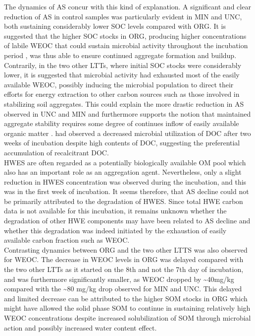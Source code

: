 \documentclass[12pt]{report}
\newcommand{\myGreen}[1]{\textcolor{olive}{#1}} %
\begin{document}
The dynamics of AS concur with this kind of explanation. A significant and clear reduction of AS in control samples was particularly evident in MIN and UNC, both sustaining considerably lower SOC levels compared with ORG. It is suggested that the higher SOC stocks in ORG, producing higher concentrations of labile WEOC that could sustain microbial activity throughout the incubation period , was thus able to ensure continued aggregate formation and buildup. Contrarily, in the two other LTTs, where initial SOC stocks were considerably lower, it is suggested that microbial activity had exhausted most of the easily available WEOC, possibly inducing the microbial population to direct their efforts for energy extraction to other carbon sources such as those involved in stabilizing soil aggregates. This could explain the more drastic reduction in AS observed in UNC and MIN and furthermore supports the notion that maintained aggregate stability requires some degree of continues inflow of easily available organic matter \citep{golchin1994}. \citet{cook1992} had observed a decreased microbial utilization of DOC after two weeks of incubation despite high contents of DOC, suggesting the preferential accumulation of recalcitrant DOC.\\
HWES are often regarded as a potentially biologically available OM pool which also has an important role as an aggregation agent. Nevertheless, only a slight reduction in HWES concentration was observed during the incubation, and this was in the first week of incubation. It seems therefore, that AS decline could not be primarily attributed to the degradation of HWES. Since total HWE carbon data is not available for this incubation, it remains unknown whether the degradation of other HWE components may have been related to AS decline and whether this degradation was indeed initiated by  the exhaustion of easily available carbon fraction such as WEOC.\\
\hypertarget{weoc_decrease}{} 
Contrasting dynamics between ORG and the two other LTTS was also observed for WEOC. The decrease in WEOC levels in ORG was delayed compared with the two other LTTs as it started on the 8th and not the 7th day of incubation, and was furthermore significantly smaller, as WEOC dropped by \~{}40mg/kg compared with the \~{}80 mg/kg drop observed for MIN and UNC. This delayed and limited decrease can be attributed to the higher SOM stocks in ORG which might have allowed the solid phase SOM to continue in sustaining relatively high WEOC concentrations despite increased solubilization of SOM through microbial action and possibly increased water content effect.\\
\end{document}
